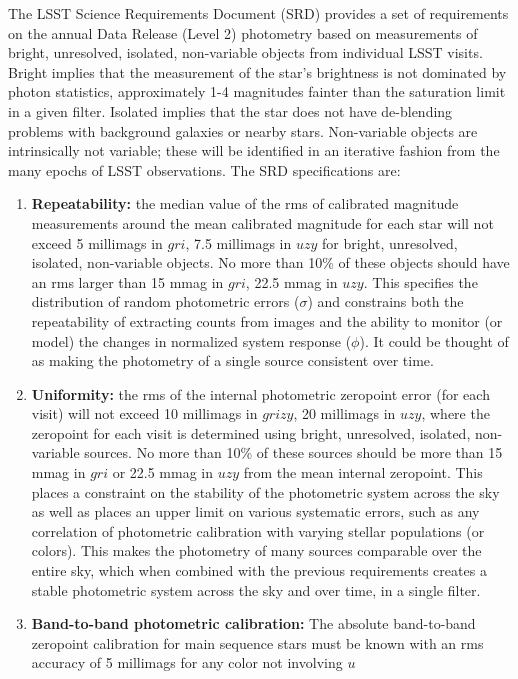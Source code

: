 \documentclass[12pt,preprint]{aastex}
\begin{document}
The LSST Science Requirements Document (SRD) provides a set of
requirements on the annual Data Release (Level 2) photometry based on
measurements of bright, unresolved, isolated, non-variable objects
from individual LSST visits. Bright implies that the
measurement of the star's brightness is not dominated by photon
statistics, approximately 1-4 magnitudes fainter than the saturation
limit in a given filter. Isolated implies that the star does not have
de-blending problems with background galaxies or nearby
stars. Non-variable objects are intrinsically not variable; these will
be identified in an iterative fashion from the many epochs of LSST
observations. The SRD specifications are: 
\begin{enumerate}
\item{{\bf Repeatability:} the median value of the rms of calibrated
magnitude measurements around the mean calibrated magnitude for each
star will not exceed 5 millimags in $gri$, 7.5 millimags in $uzy$ for
bright, unresolved, isolated, non-variable objects. No more
than 10\% of these objects should have an rms larger than 15 mmag in
$gri$, 22.5 mmag in $uzy$.  This specifies the distribution of random
photometric errors ($\sigma$) and constrains both the repeatability of
extracting counts from images and the ability to monitor (or model)
the changes in normalized system response ($\phi$). It could be
thought of as making the photometry of a single source consistent over
time. \label{repeatability_req}}
\item{{\bf Uniformity:} the rms of the internal photometric zeropoint
error (for each visit) will not exceed 10 millimags in $grizy$, 20 millimags in $uzy$,
where the zeropoint for each visit is determined using bright, unresolved, isolated, non-variable
sources. No more than 10\% of these sources should be more than 15
mmag in $gri$ or 22.5 mmag in $uzy$ from the mean internal zeropoint.
This places a constraint on the stability of the photometric system
across the sky as well as places an upper limit on various systematic
errors, such as any correlation of photometric calibration with
varying stellar populations (or colors). This makes the photometry of
many sources comparable over the entire sky, which when combined with
the previous requirements creates a stable photometric system across
the sky and over time, in a single filter. \label{uniformity_req}}
\item{{\bf Band-to-band photometric calibration:} The absolute
band-to-band zeropoint calibration for main sequence stars must be
known with an rms accuracy of 5 millimags for any color not involving $u$
}
\end{enumerate}
\end{document}
